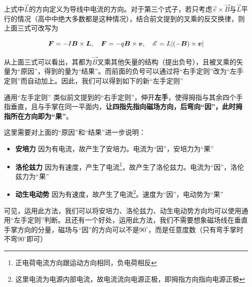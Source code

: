 上式中$\vec{L}$的方向定义为导线中电流的方向。对于第三个式子，若只考虑$\vec{v} \times \vec{B}$与$\vec{L}$平行的情况（高中中绝大多数都是这种情况），结合前文提到的叉乘的反交换律，则上面三式可改写为

$$\boldsymbol{F} = - I \boldsymbol{B} \times \boldsymbol{L}, \quad \boldsymbol{F} = - q \boldsymbol{B} \times \boldsymbol{v}, \quad \mathscr{E} = L | (- \boldsymbol{B}) \times \boldsymbol{v} |$$

从上面三式可以看出，其都为$\vec{B}$叉乘其他矢量的结构（提出负号），且被叉乘的矢量为“原因”，得到的量为“结果”。而前面的负号可以通过将“右手定则”改为“左手定则”而自动加上。因此，我们可以得到如下的新“左手定则”

\begin{theo}{通用“左手定则”}{}
类似前文提到的“右手定则”，伸开\textbf{左手}，使得拇指与其余四个手指垂直，且与手掌在同一平面内，\textbf{让四指先指向磁场方向，后弯向“因”，此时拇指所在方向即为“果”}。

这里需要对上面的“原因”和“结果”进一步说明：

\begin{itemize}
	\item \textbf{安培力} \quad 因为有电流，故产生了安培力。电流为“因”，安培力为“果”
	\item \textbf{洛伦兹力} \quad 因为有速度，产生了电流\footnote{正电荷电流方向跟运动方向相同，负电荷相反}，故产生了洛伦兹力。电流为“因”，洛伦兹力为“果”
	\item \textbf{动生电动势} \quad 因为有速度，故产生了电流\footnote{这里电流为电源内部电流，故电流流向电源正极，即拇指方向指向电源正极}。速度为“因”，电动势为“果”
\end{itemize}

\end{theo}

可见，运用此方法，我们可以将安培力、洛伦兹力、动生电动势方向均可以使用通用“左手定则”判断。且还有一个好处，运用此方法，我们不需要想象磁场线在垂直手掌方向的分量，磁场与“因”的方向可以不是$90^{\circ}$，而是任意度数（只有弯手掌时不弯$90^{\circ}$即可）